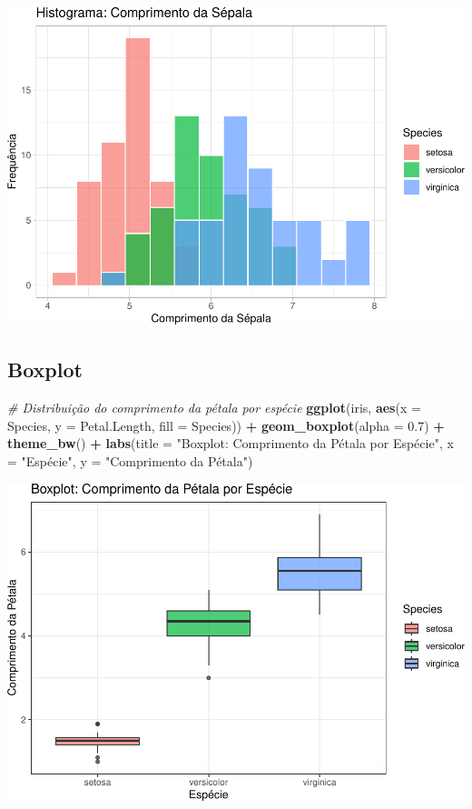 \documentclass[
]{book}
\newenvironment{Shaded}{\begin{snugshade}}{\end{snugshade}}
\newcommand{\AttributeTok}[1]{\textcolor[rgb]{0.13,0.29,0.53}{#1}}
\newcommand{\CommentTok}[1]{\textcolor[rgb]{0.56,0.35,0.01}{\textit{#1}}}
\newcommand{\FloatTok}[1]{\textcolor[rgb]{0.00,0.00,0.81}{#1}}
\newcommand{\FunctionTok}[1]{\textcolor[rgb]{0.13,0.29,0.53}{\textbf{#1}}}
\newcommand{\NormalTok}[1]{#1}
\newcommand{\SpecialCharTok}[1]{\textcolor[rgb]{0.81,0.36,0.00}{\textbf{#1}}}
\newcommand{\StringTok}[1]{\textcolor[rgb]{0.31,0.60,0.02}{#1}}
\begin{document}
\includegraphics{LivroEstatisticaR_files/figure-latex/gghistIris-1.pdf}

\subsection{Boxplot}\label{boxplot-1}

\begin{Shaded}
\begin{Highlighting}[]
\CommentTok{\# Distribuição do comprimento da pétala por espécie}
\FunctionTok{ggplot}\NormalTok{(iris, }\FunctionTok{aes}\NormalTok{(}\AttributeTok{x =}\NormalTok{ Species, }\AttributeTok{y =}\NormalTok{ Petal.Length, }\AttributeTok{fill =}\NormalTok{ Species)) }\SpecialCharTok{+}
  \FunctionTok{geom\_boxplot}\NormalTok{(}\AttributeTok{alpha =} \FloatTok{0.7}\NormalTok{) }\SpecialCharTok{+}
  \FunctionTok{theme\_bw}\NormalTok{() }\SpecialCharTok{+}
  \FunctionTok{labs}\NormalTok{(}\AttributeTok{title =} \StringTok{"Boxplot: Comprimento da Pétala por Espécie"}\NormalTok{,}
       \AttributeTok{x =} \StringTok{"Espécie"}\NormalTok{,}
       \AttributeTok{y =} \StringTok{"Comprimento da Pétala"}\NormalTok{)}
\end{Highlighting}
\end{Shaded}

\includegraphics{LivroEstatisticaR_files/figure-latex/ggboxplotIris-1.pdf}
\end{document}
